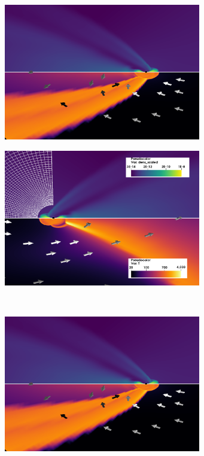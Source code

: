 \documentclass{aa}
\begin{document}
\begin{figure}
\begin{subfigure}{0.5\textwidth}
\begin{center}
\includegraphics[width=8.6cm]{Pictures/isoHot_1.png} 
\label{fig:subim1}
\end{center}
\end{subfigure}
\begin{subfigure}{0.5\textwidth}
\begin{center}
\includegraphics[width=8.6cm]{Pictures/isoHot_2.png}
\label{fig:subim2}
\end{center}
\end{subfigure}
\vspace*{0.8cm}\\
\hspace*{-0.2cm}
\begin{subfigure}{0.5\textwidth}
\begin{center}
\includegraphics[width=8.6cm]{Pictures/isoHot_1.png}

\end{center}
\end{subfigure}
\end{figure}
\end{document}
